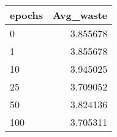 \begin{tabular}{lr}
\toprule
epochs &  Avg\_waste \\
\midrule
     0 &   3.855678 \\
     1 &   3.855678 \\
    10 &   3.945025 \\
    25 &   3.709052 \\
    50 &   3.824136 \\
   100 &   3.705311 \\
\bottomrule
\end{tabular}
